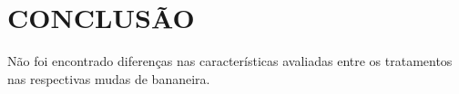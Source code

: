 \chapter{CONCLUSÃO}
Não foi encontrado diferenças nas características avaliadas entre os tratamentos nas respectivas mudas de bananeira.
